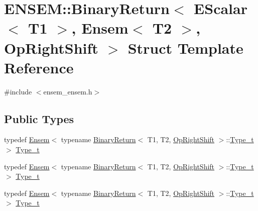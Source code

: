 \hypertarget{structENSEM_1_1BinaryReturn_3_01EScalar_3_01T1_01_4_00_01Ensem_3_01T2_01_4_00_01OpRightShift_01_4}{}\section{E\+N\+S\+EM\+:\+:Binary\+Return$<$ E\+Scalar$<$ T1 $>$, Ensem$<$ T2 $>$, Op\+Right\+Shift $>$ Struct Template Reference}
\label{structENSEM_1_1BinaryReturn_3_01EScalar_3_01T1_01_4_00_01Ensem_3_01T2_01_4_00_01OpRightShift_01_4}


{\ttfamily \#include $<$ensem\+\_\+ensem.\+h$>$}

\subsection*{Public Types}
\begin{DoxyCompactItemize}
\item 
typedef \mbox{\hyperlink{classENSEM_1_1Ensem}{Ensem}}$<$ typename \mbox{\hyperlink{structENSEM_1_1BinaryReturn}{Binary\+Return}}$<$ T1, T2, \mbox{\hyperlink{structENSEM_1_1OpRightShift}{Op\+Right\+Shift}} $>$\+::\mbox{\hyperlink{structENSEM_1_1BinaryReturn_3_01EScalar_3_01T1_01_4_00_01Ensem_3_01T2_01_4_00_01OpRightShift_01_4_ae17b6e4618444d5f927205f6af98d654}{Type\+\_\+t}} $>$ \mbox{\hyperlink{structENSEM_1_1BinaryReturn_3_01EScalar_3_01T1_01_4_00_01Ensem_3_01T2_01_4_00_01OpRightShift_01_4_ae17b6e4618444d5f927205f6af98d654}{Type\+\_\+t}}
\item 
typedef \mbox{\hyperlink{classENSEM_1_1Ensem}{Ensem}}$<$ typename \mbox{\hyperlink{structENSEM_1_1BinaryReturn}{Binary\+Return}}$<$ T1, T2, \mbox{\hyperlink{structENSEM_1_1OpRightShift}{Op\+Right\+Shift}} $>$\+::\mbox{\hyperlink{structENSEM_1_1BinaryReturn_3_01EScalar_3_01T1_01_4_00_01Ensem_3_01T2_01_4_00_01OpRightShift_01_4_ae17b6e4618444d5f927205f6af98d654}{Type\+\_\+t}} $>$ \mbox{\hyperlink{structENSEM_1_1BinaryReturn_3_01EScalar_3_01T1_01_4_00_01Ensem_3_01T2_01_4_00_01OpRightShift_01_4_ae17b6e4618444d5f927205f6af98d654}{Type\+\_\+t}}
\item 
typedef \mbox{\hyperlink{classENSEM_1_1Ensem}{Ensem}}$<$ typename \mbox{\hyperlink{structENSEM_1_1BinaryReturn}{Binary\+Return}}$<$ T1, T2, \mbox{\hyperlink{structENSEM_1_1OpRightShift}{Op\+Right\+Shift}} $>$\+::\mbox{\hyperlink{structENSEM_1_1BinaryReturn_3_01EScalar_3_01T1_01_4_00_01Ensem_3_01T2_01_4_00_01OpRightShift_01_4_ae17b6e4618444d5f927205f6af98d654}{Type\+\_\+t}} $>$ \mbox{\hyperlink{structENSEM_1_1BinaryReturn_3_01EScalar_3_01T1_01_4_00_01Ensem_3_01T2_01_4_00_01OpRightShift_01_4_ae17b6e4618444d5f927205f6af98d654}{Type\+\_\+t}}
\end{DoxyCompactItemize}


